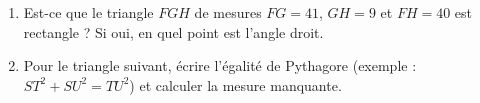 
\begin{exercice}\label{exosmath-0963}

    \begin{enumerate}
        \item
            Est-ce que le triangle \( FGH\) de mesures \( FG=41\), \( GH=9\) et \( FH=40\) est rectangle ? Si oui, en quel point est l'angle droit.
        \item
            Pour le triangle suivant, écrire l'égalité de Pythagore (exemple : \( ST^2+SU^2=TU^2\)) et calculer la mesure manquante.
            \begin{center}
   
            \end{center}
    \end{enumerate}

\end{exercice}
